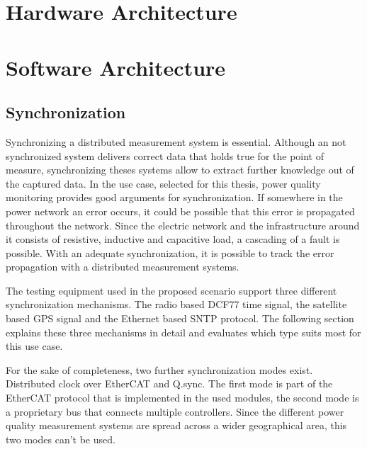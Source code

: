 \section{Hardware Architecture}

\section{Software Architecture}

\subsection{Synchronization}
Synchronizing a distributed measurement system is essential. Although an not synchronized system delivers correct data that holds true for the point of measure, synchronizing theses systems allow to extract further knowledge out of the captured data. In the use case, selected for this thesis, power quality monitoring provides good arguments for synchronization. If somewhere in the power network an error occurs, it could be possible that this error is propagated throughout the network. Since the electric network and the infrastructure around it consists of resistive, inductive and capacitive load, a cascading of a fault is possible. With an adequate synchronization, it is possible to track the error propagation with a distributed measurement systems.

The testing equipment used in the proposed scenario support three different synchronization mechanisms. The radio based DCF77 time signal, the satellite based GPS signal and the Ethernet based SNTP protocol. The following section explains these three mechanisms in detail and evaluates which type suits most for this use case.

For the sake of completeness, two further synchronization modes exist. Distributed clock over EtherCAT and Q.sync. The first mode is part of the EtherCAT protocol that is implemented in the used modules, the second mode is a proprietary bus that connects multiple controllers. Since the different power quality measurement systems are spread across a wider geographical area, this two modes can't be used.

